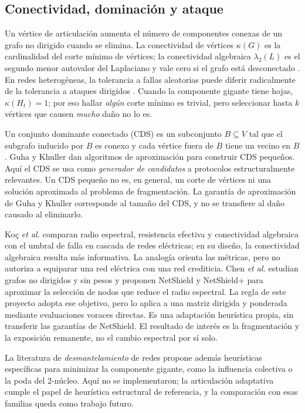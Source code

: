 \documentclass[journal]{IEEEtran}
\begin{document}
\subsection{Conectividad, dominación y ataque}

Un vértice de articulación aumenta el número de componentes conexas de un
grafo no dirigido cuando se elimina.
La conectividad de vértices $\kappa(G)$ es la cardinalidad del corte mínimo de
vértices; la conectividad algebraica $\lambda_2(L)$ es el segundo menor
autovalor del Laplaciano y vale cero si el grafo está desconectado
\cite{fiedler1973algebraic}. En redes heterogéneas, la tolerancia a fallas
aleatorias puede diferir radicalmente de la tolerancia a ataques dirigidos
\cite{albert2000error}. Cuando la componente gigante tiene hojas,
$\kappa(H_t)=1$; por eso hallar \emph{algún} corte mínimo es trivial,
pero seleccionar hasta $k$ vértices que causen \emph{mucho} daño no lo es.

Un conjunto dominante conectado (CDS) es un subconjunto $B\subseteq V$ tal que
el subgrafo inducido por $B$ es conexo y cada vértice fuera de $B$ tiene un
vecino en $B$. Guha y Khuller \cite{guha1998approximation} dan algoritmos de
aproximación para construir CDS pequeños. Aquí el CDS se usa como
\emph{generador de candidatos} a protocolos estructuralmente relevantes. Un CDS
pequeño no es, en general, un corte de vértices ni una solución aproximada al
problema de fragmentación. La garantía de aproximación de Guha y Khuller
corresponde al tamaño del CDS, y no se transfiere al daño causado al eliminarlo.

Koç \emph{et al.} \cite{koc2014topological} comparan radio espectral,
resistencia efectiva y conectividad algebraica con el umbral de falla en
cascada de redes eléctricas; en su diseño, la conectividad algebraica resulta
más informativa. La analogía orienta las métricas, pero no autoriza a equiparar
una red eléctrica con una red crediticia. Chen \emph{et al.}
\cite{chen2016node} estudian grafos no dirigidos y sin pesos y proponen
NetShield y NetShield+ para aproximar la selección de nodos que reduce el
radio espectral. La regla de este proyecto adopta ese objetivo, pero lo aplica
a una matriz dirigida y ponderada mediante evaluaciones voraces directas.
Es una adaptación heurística propia, sin transferir las garantías de
NetShield. El resultado de interés es la fragmentación y la exposición
remanente, no el cambio espectral por sí solo.

La literatura de \emph{desmantelamiento} de redes propone además heurísticas
específicas para minimizar la componente gigante, como la influencia colectiva
o la poda del 2-núcleo. Aquí no se implementaron; la articulación adaptativa
cumple el papel de heurística estructural de referencia, y la comparación con
esas familias queda como trabajo futuro.
\end{document}
